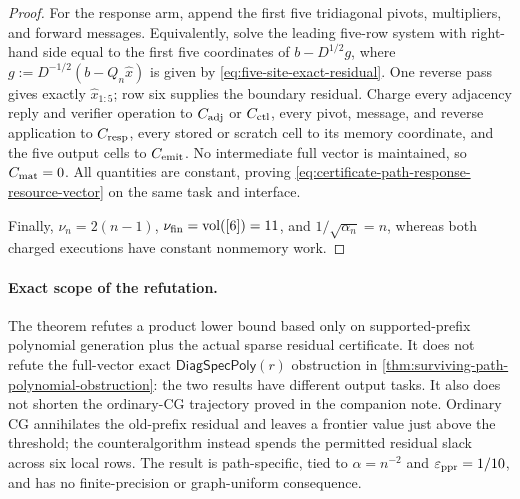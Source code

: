 \begin{proof}
For the response arm, append the first five tridiagonal pivots, multipliers,
and forward messages.  Equivalently, solve the leading five-row system with
right-hand side equal to the first five coordinates of
$b-D^{1/2}g$, where
$g:=D^{-1/2}(b-Q_n\widehat x)$ is given by
\cref{eq:five-site-exact-residual}.  One reverse pass gives exactly
$\widehat x_{1:5}$; row six supplies the boundary residual.  Charge every
adjacency reply and verifier operation to $C_{\rm adj}$ or $C_{\rm ctl}$,
every pivot, message, and reverse application to $C_{\rm resp}$, every stored
or scratch cell to its memory coordinate, and the five output cells to
$C_{\rm emit}$.  No intermediate full vector is maintained, so
$C_{\rm mat}=0$.  All quantities are constant, proving
\cref{eq:certificate-path-response-resource-vector} on the same task and
interface.

Finally, $\nu_n=2(n-1)$, $\nu_{\rm fin}=\operatorname{vol}([6])=11$, and
$1/\sqrt{\alpha_n}=n$, whereas both charged executions have constant
nonmemory work.
\end{proof}

\paragraph{Exact scope of the refutation.}
The theorem refutes a product lower bound based only on supported-prefix
polynomial generation plus the actual sparse residual certificate.  It does
not refute the full-vector exact
$\mathsf{DiagSpecPoly}(r)$ obstruction in
\cref{thm:surviving-path-polynomial-obstruction}: the two results have
different output tasks.  It also does not shorten the ordinary-CG trajectory
proved in the companion note.  Ordinary CG annihilates the old-prefix
residual and leaves a frontier value just above the threshold; the
counteralgorithm instead spends the permitted residual slack across six local
rows.  The result is path-specific, tied to $\alpha=n^{-2}$ and
$\varepsilon_{\mathrm{ppr}}=1/10$, and has no finite-precision or graph-uniform consequence.
